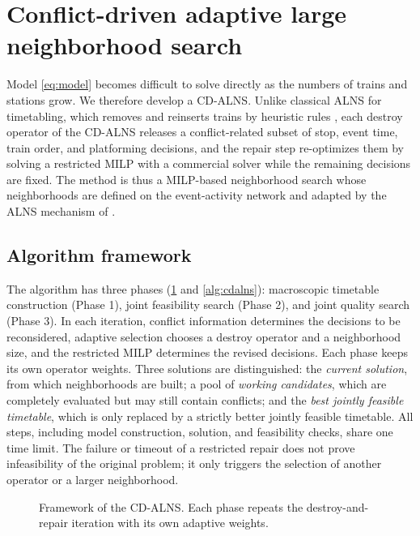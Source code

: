 \section{Conflict-driven adaptive large neighborhood search}\label{sec:alg}
Model \eqref{eq:model} becomes difficult to solve directly as the numbers of trains and stations grow. We therefore develop a CD-ALNS. Unlike classical ALNS for timetabling, which removes and reinserts trains by heuristic rules \citep[e.g.,][]{Dong2020}, each destroy operator of the CD-ALNS releases a conflict-related subset of stop, event time, train order, and platforming decisions, and the repair step re-optimizes them by solving a restricted MILP with a commercial solver while the remaining decisions are fixed. The method is thus a MILP-based neighborhood search \citep{Fischetti2003,Danna2005} whose neighborhoods are defined on the event-activity network and adapted by the ALNS mechanism of \citet{Ropke2006}.

\subsection{Algorithm framework}\label{sec:framework}
The algorithm has three phases (\cref{fig:framework} and \cref{alg:cdalns}): macroscopic timetable construction (Phase 1), joint feasibility search (Phase 2), and joint quality search (Phase 3). In each iteration, conflict information determines the decisions to be reconsidered, adaptive selection chooses a destroy operator and a neighborhood size, and the restricted MILP determines the revised decisions. Each phase keeps its own operator weights. Three solutions are distinguished: the \emph{current solution}, from which neighborhoods are built; a pool of \emph{working candidates}, which are completely evaluated but may still contain conflicts; and the \emph{best jointly feasible timetable}, which is only replaced by a strictly better jointly feasible timetable. All steps, including model construction, solution, and feasibility checks, share one time limit. The failure or timeout of a restricted repair does not prove infeasibility of the original problem; it only triggers the selection of another operator or a larger neighborhood.

\begin{figure}[tb]
\centering
\resizebox{\textwidth}{!}{}
\caption{Framework of the CD-ALNS. Each phase repeats the destroy-and-repair iteration with its own adaptive weights.}\label{fig:framework}
\end{figure}

